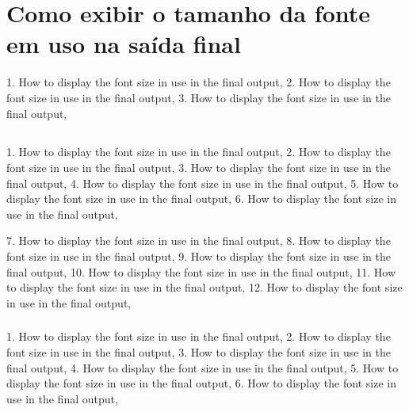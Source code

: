 


%
%

\chapter[Anexo exemplo]{Como exibir o tamanho da fonte em uso na saída final}

\showfont

1. How to display the font size in use in the final output,
2. How to display the font size in use in the final output,
3. How to display the font size in use in the final output,


\section[Some encoding tests]{\showfont}

1. How to display the font size in use in the final output,
2. How to display the font size in use in the final output,
3. How to display the font size in use in the final output,
4. How to display the font size in use in the final output,
5. How to display the font size in use in the final output,
6. How to display the font size in use in the final output,

7. How to display the font size in use in the final output,
8. How to display the font size in use in the final output,
9. How to display the font size in use in the final output,
10. How to display the font size in use in the final output,
11. How to display the font size in use in the final output,
12. How to display the font size in use in the final output,

\subsection{\showfont}

1. How to display the font size in use in the final output,
2. How to display the font size in use in the final output,
3. How to display the font size in use in the final output,
4. How to display the font size in use in the final output,
5. How to display the font size in use in the final output,
6. How to display the font size in use in the final output,

